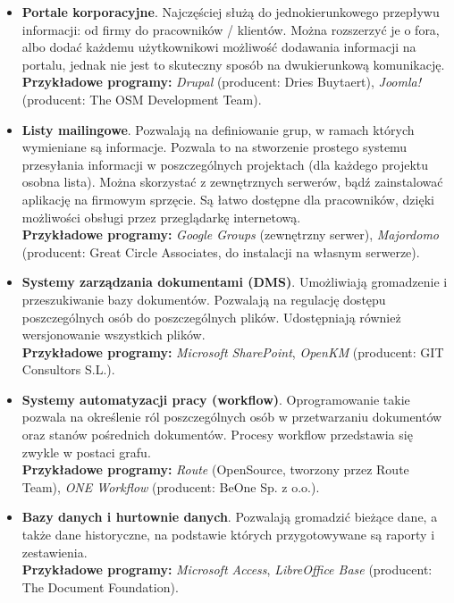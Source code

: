 \begin{itemize}
\item \textbf{Portale korporacyjne}. Najczęściej służą do jednokierunkowego przepływu informacji: od firmy do pracowników / klientów. Można rozszerzyć je o fora, albo dodać każdemu użytkownikowi możliwość dodawania informacji na portalu, jednak nie jest to skuteczny sposób na dwukierunkową komunikację.\\
\textbf{Przykładowe programy:} \textit{Drupal} (producent: Dries Buytaert), \textit{Joomla!} (producent: The OSM Development Team).

\item \textbf{Listy mailingowe}. Pozwalają na definiowanie grup, w ramach których wymieniane są informacje. Pozwala to na stworzenie prostego systemu przesyłania informacji w poszczególnych projektach (dla każdego projektu osobna lista). Można skorzystać z zewnętrznych serwerów, bądź zainstalować aplikację na firmowym sprzęcie. Są łatwo dostępne dla pracowników, dzięki możliwości obsługi przez przeglądarkę internetową. \\
\textbf{Przykładowe programy:} \textit{Google Groups} (zewnętrzny serwer), \textit{Majordomo} (producent: Great Circle Associates, do instalacji na własnym serwerze).

\item \textbf{Systemy zarządzania dokumentami (DMS)}. Umożliwiają gromadzenie i przeszukiwanie bazy dokumentów. Pozwalają na regulację dostępu poszczególnych osób do poszczególnych plików. Udostępniają również wersjonowanie wszystkich plików.\\
\textbf{Przykładowe programy:} \textit{Microsoft SharePoint}, \textit{OpenKM} (producent: GIT Consultors S.L.).

\item \textbf{Systemy automatyzacji pracy (workflow)}. Oprogramowanie takie pozwala na określenie ról poszczególnych osób w przetwarzaniu dokumentów oraz stanów pośrednich dokumentów. Procesy workflow przedstawia się zwykle w postaci grafu. \\
\textbf{Przykładowe programy:} \textit{Route} (OpenSource, tworzony przez Route Team), \textit{ONE Workflow} (producent: BeOne Sp. z o.o.).

\item \textbf{Bazy danych i hurtownie danych}. Pozwalają gromadzić bieżące dane, a także dane historyczne, na podstawie których przygotowywane są raporty i zestawienia.\\
\textbf{Przykładowe programy:} \textit{Microsoft Access}, \textit{LibreOffice Base} (producent: The Document Foundation).


\end{itemize}
